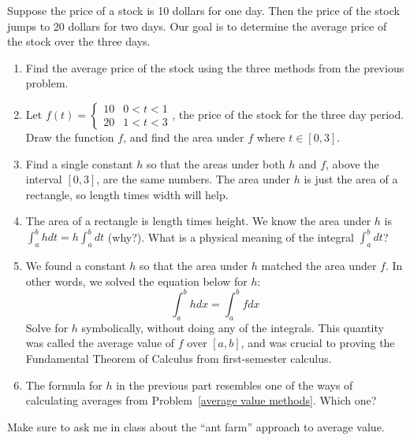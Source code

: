 \begin{problem}
 Suppose the price of a stock is 10 dollars for one day.  Then the price of the stock jumps to 20 dollars for two days.  Our goal is to determine the average price of the stock over the three days.
\begin{enumerate}
 \item Find the average price of the stock using the three methods from the previous problem.
 \item Let $f(t) = \begin{cases}10 &0<t<1\\20&1<t<3\end{cases}$, the price of the stock for the three day period. Draw the function $f$, and find the area under $f$ where $t\in[0,3]$.
 \item Find a single constant $h$ so that the areas under both $h$ and $f$, above the interval $[0,3]$, are the same numbers.  The area under $h$ is just the area of a rectangle, so length times width will help.
 \item The area of a rectangle is length times height.  We know the area under $h$ is $\int_a^b hdt = h \int_a^bdt$ (why?). What is a physical meaning of the integral $\int_a^b dt$?
 \item We found a constant $h$ so that the area under $h$ matched the area under $f$. In other words, we solved the equation below for $h$: 
$$\int_a^b h dx = \int_a^b f dx$$
  Solve for $h$ symbolically, without doing any of the integrals. This quantity was called the average value of $f$ over $[a,b]$, and was crucial to proving the Fundamental Theorem of Calculus from first-semester calculus.
\item {}%
 The formula for $h$ in the previous part resembles one of the ways of calculating averages from Problem~\ref{average value methods}.  Which one?
\end{enumerate}
\end{problem}

%
Make sure to ask me in class about the ``ant farm'' approach to average value. 

